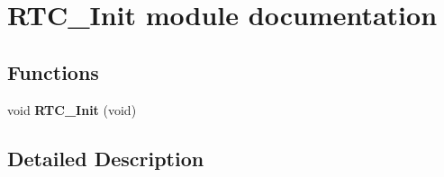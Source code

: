 \hypertarget{group___r_t_c___init__module}{}\section{R\+T\+C\+\_\+\+Init module documentation}
\label{group___r_t_c___init__module}
\subsection*{Functions}
\begin{DoxyCompactItemize}
\item 
void {\bfseries R\+T\+C\+\_\+\+Init} (void)\hypertarget{group___r_t_c___init__module_ga384f238fa0494e17f7814a4d505c20bf}{}\label{group___r_t_c___init__module_ga384f238fa0494e17f7814a4d505c20bf}

\end{DoxyCompactItemize}


\subsection{Detailed Description}
